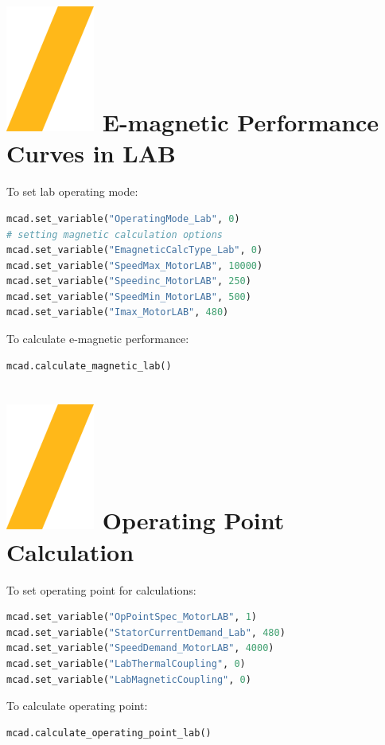 \documentclass[landscape]{article}
\begin{document}
\begin{multicols}{3}
\section{\includegraphics[height=\fontcharht\font`\S]{slash.png} E-magnetic Performance Curves in LAB}
To set lab operating mode:
\begin{lstlisting}[language=Python]
mcad.set_variable("OperatingMode_Lab", 0)
# setting magnetic calculation options
mcad.set_variable("EmagneticCalcType_Lab", 0)
mcad.set_variable("SpeedMax_MotorLAB", 10000)
mcad.set_variable("Speedinc_MotorLAB", 250)
mcad.set_variable("SpeedMin_MotorLAB", 500)
mcad.set_variable("Imax_MotorLAB", 480)	
\end{lstlisting}
To calculate e-magnetic performance:
\begin{lstlisting}[language=Python]
mcad.calculate_magnetic_lab()
\end{lstlisting}

\section{\includegraphics[height=\fontcharht\font`\S]{slash.png} Operating Point Calculation}
 To set operating point for calculations:
\begin{lstlisting}[language=Python]
mcad.set_variable("OpPointSpec_MotorLAB", 1)
mcad.set_variable("StatorCurrentDemand_Lab", 480)
mcad.set_variable("SpeedDemand_MotorLAB", 4000)
mcad.set_variable("LabThermalCoupling", 0)
mcad.set_variable("LabMagneticCoupling", 0)
\end{lstlisting}
To calculate operating point:
\begin{lstlisting}[language=Python]
mcad.calculate_operating_point_lab()
\end{lstlisting}

\end{multicols}
\end{document}
